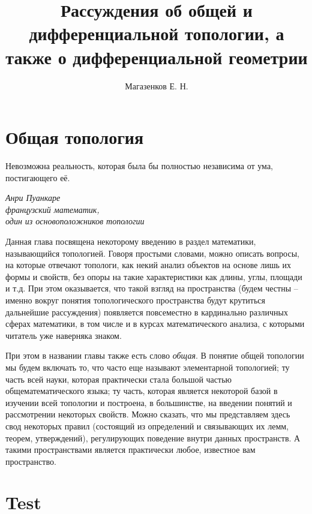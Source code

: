 \documentclass[a4paper, 12pt]{book}
\title{Рассуждения об общей и дифференциальной топологии, а также о дифференциальной геометрии}
\author{Магазенков Е. Н.}
\begin{document}
	
	\renewcommand{\contentsname}{\hfillОГЛАВЛЕНИЕ\hfill} 
	\frontmatter
	\titlepage
	
	\doublespacing
	\tableofcontents
	\let\cleardoublepage\clearpage
	\singlespacing
	
	\mainmatter
	
	\pagestyle{style}
	
	
	\chapter{Общая топология}
	\epigraph{Невозможна реальность, которая была бы полностью независима от ума, постигающего её.	\leavevmode
	}{\itshape Анри Пуанкаре\\ французский математик,\\ один из основоположников топологии}
	
    Данная глава посвящена некоторому введению в раздел математики, называющийся топологией. Говоря простыми словами, можно описать вопросы, на которые отвечают топологи, как некий анализ объектов на основе лишь их формы и свойств, без опоры на такие характеристики как длины, углы, площади и т.д. При этом оказывается, что такой взгляд на пространства (будем честны -- именно вокруг понятия топологического пространства будут крутиться дальнейшие рассуждения) появляется повсеместно в кардинально различных сферах математики, в том числе и в курсах математического анализа, с которыми читатель уже наверняка знаком. 

    При этом в названии главы также есть слово \textit{общая}. В понятие общей топологии мы будем включать то, что часто еще называют элементарной топологией; ту часть всей науки, которая практически стала большой частью общематематического языка; ту часть, которая является некоторой базой в изучении всей топологии и построена, в большинстве, на введении понятий и рассмотрении некоторых свойств. Можно сказать, что мы представляем здесь свод некоторых правил (состоящий из определений и связывающих их лемм, теорем, утверждений), регулирующих поведение внутри данных пространств. А такими пространствами является практически любое, известное вам пространство.


	
	
	
	
	
	
	
	
	
	
	
	
	
    \appendix
    \chapter{Test}
\end{document}
